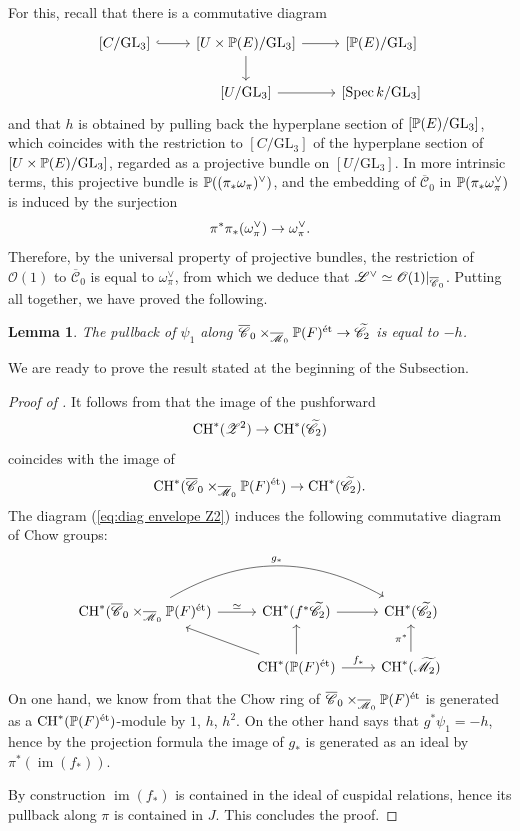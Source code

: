 \documentclass[a4paper, 10pt]{amsart}
\numberwithin{equation}{section}
\numberwithin{subsection}{section}
\newtheorem{lemma}[theorem]{Lemma}
\theoremstyle{definition}
\theoremstyle{remark}
\renewcommand{\mathcal}{\mathscr}
\newcommand\cC{\mathcal{C}} \newcommand\cD{\mathcal{D}}
\newcommand\cM{\mathcal{M}} \newcommand\cN{\mathcal{N}}
\newcommand\cO{\mathcal{O}} \newcommand\cP{\mathcal{P}}
\newcommand\arr{\ifinner\to\else\longrightarrow\fi}
\newcommand\im[1]{\operatorname{im}(#1)}
\newcommand\spec{\operatorname{Spec}}
\newcommand{\GL}{\mathrm{GL}}
\newcommand{\Mbar}{\overline{\cM}}
\newcommand{\Mtilde}{\widetilde{\mathcal M}}
\newcommand{\Cbar}{\overline{\cC}}
\newcommand{\Ctilde}{\widetilde{\mathcal C}}
\newcommand{\ch}[1][*]{\operatorname{CH}^{#1}}
\begin{document}
	For this, recall that there is a commutative diagram
	\[
	\begin{tikzcd}
		\left[ C/\GL_3 \right] \ar[r,hook] & \left[ U\times\PP(E)/\GL_3 \right] \ar[r] \ar[d] & \left[\PP(E)/\GL_3\right] \\
		& \left[U/\GL_3\right] \ar[r] & \left[\spec{k}/\GL_3\right]
	\end{tikzcd}
	\]
	and that $h$ is obtained by pulling back the hyperplane section of $[\PP(E)/\GL_3]$, which coincides with the restriction to $[C/\GL_3]$ of the hyperplane section of $[U\times\PP(E)/\GL_3]$, regarded as a projective bundle on $[U/\GL_3]$. In more intrinsic terms, this projective bundle is $\mathbb{P}((\pi_*\omega_{\pi})^{\vee})$, and the embedding of $\Cbar_0$ in $\mathbb{P}(\pi_*\omega_{\pi}^{\vee})$ is induced by the surjection
	\[ \pi^*\pi_*(\omega_{\pi}^{\vee}) \arr \omega_{\pi}^{\vee}. \]
	Therefore, by the universal property of projective bundles, the restriction of $\cO(1)$ to $\Cbar_0$ is equal to $\omega_{\pi}^\vee$, from which we deduce that $\cL^\vee \simeq \cO(1)|_{\Cbar_0}$. Putting all together, we have proved the following.
	\begin{lemma}\label{lm:pullback h}
		The pullback of $\psi_1$ along $\Cbar_0\times_{\Mbar_0}\PP(F)^{\rm \acute{e}t} \rightarrow \Ctilde_2$ is equal to $-h$.
	\end{lemma}
	We are ready to prove the result stated at the beginning of the Subsection.
	\begin{proof}[Proof of ]
		It follows from  that the image of the pushforward
		\[ \ch(\cZ^2) \arr \ch(\Ctilde_2) \]
		coincides with the image of
		\[ \ch(\Cbar_0\times_{\Mbar_0}\PP(F)^{\rm \acute{e}t}) \arr \ch(\Ctilde_2). \]
		The diagram (\ref{eq:diag envelope Z2}) induces the following commutative diagram of Chow groups:
		\[
		\begin{tikzcd}
			\ch(\Cbar_0\times_{\Mbar_0}\PP(F)^{\rm \acute{e}t}) \ar[r, "\simeq"] \ar[rr, bend left, "g_*"] & \ch(f^*\Ctilde_2) \ar[r] & \ch(\Ctilde_2) \\
			& \ch(\PP(F)^{\rm \acute{e}t}) \ar[lu] \ar[u] \ar[r, "f_*"] & \ch(\Mtilde_2) \ar[u, "\pi^*"]
		\end{tikzcd}
		\]
		On one hand, we know from  that the Chow ring of $\Cbar_0\times_{\Mbar_0}\PP(F)^{\rm \acute{e}t}$ is generated as a $\ch(\PP(F)^{\rm \acute{e}t})$-module by $1$, $h$, $h^2$. On the other hand  says that $g^*\psi_1=-h$, hence by the projection formula the image of $g_*$ is generated as an ideal by $\pi^*(\im{f_*})$.
		
		By construction $\im{f_*}$ is contained in the ideal of cuspidal relations, hence its pullback along $\pi$ is contained in $J$. This concludes the proof.
	\end{proof}
	
\end{document}
